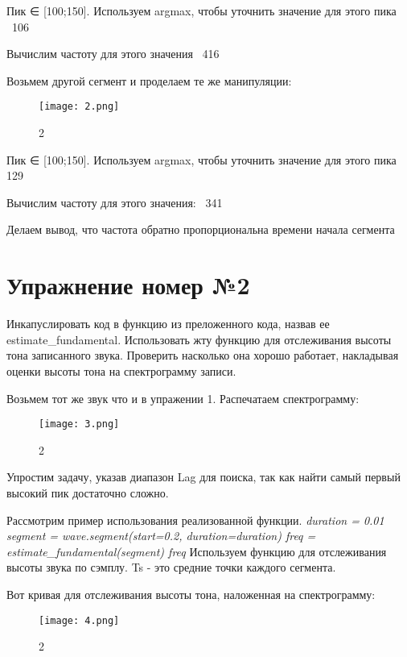 \documentclass[10pt,a4paper,oneside]{article}
\begin{document}
Пик ∈ [100;150]. Используем argmax, чтобы уточнить значение для этого пика
~106

Вычислим частоту для этого значения
~416

Возьмем другой сегмент и проделаем те же манипуляции: 

\begin{figure}[H]
        \centering
        \texttt{[image: 2.png]}
        \caption{2}
        \label{fig:first}
\end{figure}

Пик ∈ [100;150]. Используем argmax, чтобы уточнить значение для этого пика
129

Вычислим частоту для этого значения: 
~341

Делаем вывод, что частота обратно пропорциональна времени начала сегмента

\section{Упражнение номер №2}

Инкапуслировать код в функцию из преложенного кода, назвав ее estimate_fundamental. Использовать жту функцию для отслеживания высоты тона записанного звука. Проверить насколько она хорошо работает, накладывая оценки высоты тона на спектрограмму записи.

Возьмем тот же звук что и в упражении 1. Распечатаем спектрограмму: 

\begin{figure}[H]
        \centering
        \texttt{[image: 3.png]}
        \caption{2}
        \label{fig:first}
\end{figure}

Упростим задачу, указав диапазон Lag для поиска, так как найти самый первый высокий пик достаточно сложно.

Рассмотрим пример использования реализованной функции.
 \emph{duration = 0.01
	segment = wave.segment(start=0.2, duration=duration)
	freq = estimate_fundamental(segment)
	freq}
Используем функцию для отслеживания высоты звука по сэмплу. Ts - это средние точки каждого сегмента.

Вот кривая для отслеживания высоты тона, наложенная на спектрограмму:

\begin{figure}[H]
        \centering
        \texttt{[image: 4.png]}
        \caption{2}
        \label{fig:first}
\end{figure}
\end{document}
